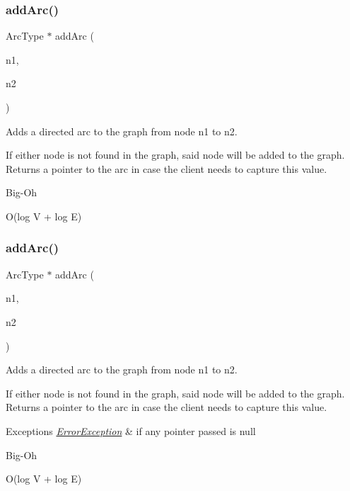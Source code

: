 \subsubsection{\texorpdfstring{add\+Arc()}{addArc()}\hspace{0.1cm}{\footnotesize\ttfamily [1/3]}}
{\footnotesize\ttfamily Arc\+Type $\ast$ add\+Arc (\begin{DoxyParamCaption}\item[{const std\+::string \&}]{n1,  }\item[{const std\+::string \&}]{n2 }\end{DoxyParamCaption})}



Adds a directed arc to the graph from node n1 to n2. 

If either node is not found in the graph, said node will be added to the graph. Returns a pointer to the arc in case the client needs to capture this value. \begin{DoxyRefDesc}{Big-\/\+Oh}
\item[\mbox{\hyperlink{BigOh__BigOh000042}{Big-\/\+Oh}}]O(log V + log E) \end{DoxyRefDesc}
\mbox{\label{classGraph_a7280d3cd76bab82df392ba91ed5257c6}} 
\subsubsection{\texorpdfstring{add\+Arc()}{addArc()}\hspace{0.1cm}{\footnotesize\ttfamily [2/3]}}
{\footnotesize\ttfamily Arc\+Type $\ast$ add\+Arc (\begin{DoxyParamCaption}\item[{Node\+Type $\ast$}]{n1,  }\item[{Node\+Type $\ast$}]{n2 }\end{DoxyParamCaption})}



Adds a directed arc to the graph from node n1 to n2. 

If either node is not found in the graph, said node will be added to the graph. Returns a pointer to the arc in case the client needs to capture this value.


\begin{DoxyExceptions}{Exceptions}
{\em \mbox{\hyperlink{classErrorException}{Error\+Exception}}} & if any pointer passed is null \\
\hline
\end{DoxyExceptions}
\begin{DoxyRefDesc}{Big-\/\+Oh}
\item[\mbox{\hyperlink{BigOh__BigOh000043}{Big-\/\+Oh}}]O(log V + log E) \end{DoxyRefDesc}
\mbox{\label{classGraph_aa1b6553e579c03260253a2d731668dfa}} 
